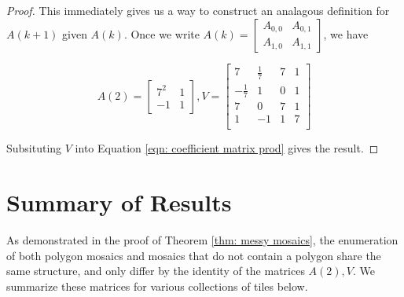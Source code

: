 \documentclass[12pt]{article}
\newtheorem{theorem}{Theorem}
\theoremstyle{plain}
\theoremstyle{definition}
\theoremstyle{remark}
\theoremstyle{definition}
\begin{document}
\begin{proof}
This immediately gives us a way to construct an analagous definition for $A(k+1)$ given $A(k)$. Once we write $A(k) = \begin{bmatrix} A_{0,0} & A_{0,1} \\ A_{1,0} & A_{1,1} \end{bmatrix}$, we have

$$
A(2) = 
\begin{bmatrix}
    7^2 & 1 \\
    -1 & 1
\end{bmatrix},
V = 
\begin{bmatrix}
    7 & \frac{1}{7} & 7 & 1 \\
    -\frac{1}{7} & 1 & 0 & 1 \\
    7 & 0 & 7  & 1 \\
    1 & -1 & 1 & 7 \\
\end{bmatrix}
$$

Subsituting $V$ into Equation \ref{eqn: coefficient matrix prod} gives the result.

\end{proof}



\section{Summary of Results}
\label{section: summary of results}

As demonstrated in the proof of Theorem \ref{thm: messy mosaics}, the enumeration of both polygon mosaics and mosaics that do not contain a polygon share the same structure, and only differ by the identity of the matrices $A(2), V$. We summarize these matrices for various collections of tiles below.
\end{document}

